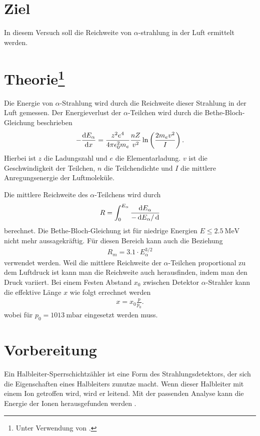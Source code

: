 \section{Ziel}
In diesem Versuch soll die Reichweite von $\alpha$-strahlung in der Luft ermittelt werden.

\section[Theorie]{Theorie\footnote[1]{Unter Verwendung von \cite{man:v701}.}}
Die Energie von $\alpha$-Strahlung wird durch die Reichweite dieser Strahlung in der Luft gemessen.
Der Energieverlust der $\alpha$-Teilchen wird durch die Bethe-Bloch-Gleichung beschrieben
\begin{align}
    -\frac{\mathop{}\!\mathrm{d} E_\alpha}{\mathop{}\!\mathrm{d} x} = \frac{z^2 e^4}{4 \pi \epsilon_0^2 m_e} \frac{n Z}{v^2} \ln\left(\frac{2 m_e v^2}{I}\right).
\end{align}%
Hierbei ist $z$ die Ladungszahl und $e$ die Elementarladung. %
$v$ ist die Geschwindigkeit der Teilchen, $n$ die Teilchendichte und $I$ die mittlere Anregungsenergie der Luftmoleküle.

Die mittlere Reichweite des $\alpha$-Teilchens wird durch 
\begin{align}
    R = \int_0^{E_\alpha} \frac{\mathop{}\!\mathrm{d} E_\alpha}{-\mathop{}\!\mathrm{d} E_\alpha / \mathop{}\!\mathrm{d}}
\end{align}
berechnet.
Die Bethe-Bloch-Gleichung ist für niedrige Energien $E \leq \qty{2.5}{\mega\electronvolt}$ nicht mehr aussagekräftig.
Für diesen Bereich kann auch die Beziehung 
\begin{align}
    R_m = 3.1 \cdot E_\alpha^{3/2} 
    \label{eq:reichweite}
\end{align}
verwendet werden.
Weil die mittlere Reichweite der $\alpha$-Teilchen proportional zu dem Luftdruck ist kann man die Reichweite auch herausfinden,
indem man den Druck variiert.
Bei einem Festen Abstand $x_0$ zwischen Detektor $\alpha$-Strahler kann die effektive Länge $x$ wie folgt errechnet werden
\begin{align}
    x = x_0 \frac{p}{p_0}.
    \label{eq:effektive_laenge}
\end{align}
wobei für $p_0 = \qty{1013}{\milli\bar}$ eingesetzt werden muss.



\section{Vorbereitung}
Ein Halbleiter-Sperrschichtzähler ist eine Form des Strahlungsdetektors, der sich die Eigenschaften eines Halbleiters zunutze macht.
Wenn dieser Halbleiter mit einem Ion getroffen wird, wird er leitend. 
Mit der passenden Analyse kann die Energie der Ionen herausgefunden werden \cite[vgl.]{man:v701}.